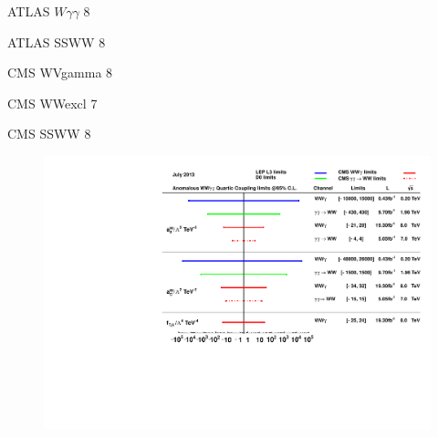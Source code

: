 ATLAS $W\gamma\gamma$ 8 \TeV~\cite{Aad:2015uqa}

ATLAS SSWW 8 \TeV~\cite{Aad:2014zda}

CMS WVgamma 8 \TeV~\cite{Chatrchyan:2014bza}

CMS WWexcl 7 \TeV~\cite{Chatrchyan:2013foa}

CMS SSWW 8 \TeV~\cite{Khachatryan:2014sta}

\begin{figure}[p]
    \centering
    \includegraphics[height=0.3\textheight]{figures/ss-precision-qgc-wwgg.pdf}
    \caption{}
    \label{fig:ss-precision-qgc-wwgg}
\end{figure}
